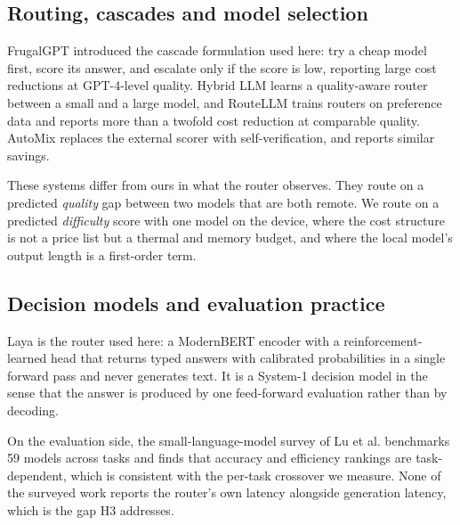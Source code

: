 \documentclass[11pt,a4paper]{article}
\begin{document}
\subsection{Routing, cascades and model selection}
FrugalGPT \cite{frugalgpt} introduced the cascade formulation used here: try a
cheap model first, score its answer, and escalate only if the score is low,
reporting large cost reductions at GPT-4-level quality. Hybrid LLM
\cite{hybridllm} learns a quality-aware router between a small and a large
model, and RouteLLM \cite{routellm} trains routers on preference data and
reports more than a twofold cost reduction at comparable quality. AutoMix
\cite{automix} replaces the external scorer with self-verification, and reports
similar savings.

These systems differ from ours in what the router observes. They route on a
predicted \emph{quality} gap between two models that are both remote. We route
on a predicted \emph{difficulty} score with one model on the device, where the
cost structure is not a price list but a thermal and memory budget, and where
the local model's output length is a first-order term.

\subsection{Decision models and evaluation practice}
Laya \cite{laya} is the router used here: a ModernBERT encoder with a
reinforcement-learned head that returns typed answers with calibrated
probabilities in a single forward pass and never generates text. It is a
System-1 decision model in the sense that the answer is produced by one
feed-forward evaluation rather than by decoding.

On the evaluation side, the small-language-model survey of Lu et al.
\cite{slmsurvey} benchmarks 59 models across tasks and finds that accuracy and
efficiency rankings are task-dependent, which is consistent with the per-task
crossover we measure. None of the surveyed work reports the router's own
latency alongside generation latency, which is the gap H3 addresses.
\end{document}
